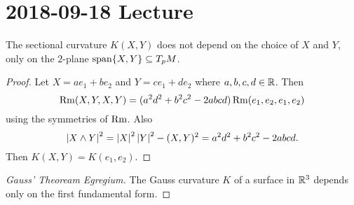 \section{2018-09-18 Lecture}

\begin{prop}
  The sectional curvature $K(X,Y)$ does not depend on the choice of $X$ and $Y$, only on the $2$-plane $\operatorname{span}\{X,Y\} \subseteq T_pM$.
\end{prop}

\begin{proof}
  Let $X=ae_1+be_2$ and $Y=ce_1+de_2$ where $a,b,c,d\in\mathbb{R}$.
  Then
  \[ \operatorname{Rm}(X,Y,X,Y) = (a^2d^2+b^2c^2-2abcd)\operatorname{Rm}(e_1,e_2,e_1,e_2) \]
  using the symmetries of $\operatorname{Rm}$.
  Also
  \[ \left\lvert X \wedge Y \right\rvert^2 = \left\lvert X \right\rvert^2 \left\lvert Y \right\rvert^2 - (X,Y)^2 = a^2d^2+b^2c^2-2abcd. \]
  Then $K(X,Y) = K(e_1,e_2)$.
\end{proof}

\begin{proof}[Gauss' Theoream Egregium]
  The Gauss curvature $K$ of a surface in $\mathbb{R}^3$ depends only on the first fundamental form.
\end{proof}

